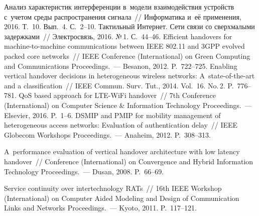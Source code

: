 \begin{multicols}{2}
{{\begin{thebibliography}{99}
 Анализ характеристик интерференции в~модели 
взаимодействия устройств с~учетом среды распространения сигнала~// 
Информатика и~её применения, 2016. Т.~10. Вып.~4. С.~2--10.
 Тактильный 
Интернет. Сети связи со сверхмалыми задержками~// Электросвязь, 2016. №\,1. 
С.~44--46.
 Efficient 
handovers for machine-to-machine communications between IEEE 802.11 and 3GPP 
evolved packed core networks~//  IEEE  Conference (International) on Green 
Computing and Communications Proceedings.~--- 
\mbox{Besan{\!}on}, 2012. P.~722--725.
 Enabling vertical handover decisions in 
heterogeneous wireless networks: A~state-of-the-art and a classification~// IEEE 
Commun. Surv.  Tut., 2014. Vol.~16. No.\,2. P.~776--781.
 QoS based approach for LTE-WiFi handover~// 7th 
Conference (International) on Computer Science \& Information Technology 
Proceedings.~--- Elsevier, 2016. P.~1--6.
 DSMIP and PMIP for mobility 
management of heterogeneous access networks: Evaluation of authentication 
delay~//  IEEE Globecom Workshops Proceedings.~--- Anaheim, 2012.  
P.~308--313.

A~performance evaluation of vertical handover architecture with low latency 
handover~//  Conference (International) on Convergence and Hybrid Information 
Technology Proceedings.~--- Dusan, 2008. P.~66--69.

Service continuity over intertechnology RATs~// 16th IEEE  Workshop 
(International) on Computer Aided Modeling and Design of Communication Links 
and Networks Proceedings.~--- Kyoto, 2011. P.~117--121.


\end{thebibliography}}}
\end{multicols}

